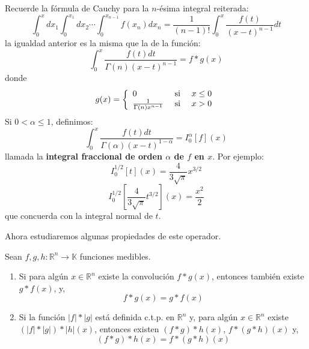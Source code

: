 \documentclass[12pt]{report}
\theoremstyle{largebreak}
\newcommand\cf[3]{\ensuremath{#1:#2\rightarrow#3}}
\newcommand\abs[1]{\ensuremath{\big|#1\big|}}
\begin{document}
    \begin{exa}
        Recuerde la fórmula de Cauchy para la $n$-ésima integral reiterada:
        \begin{equation*}
            \int_{ 0}^xdx_1\int_0^{x_1}dx_2\cdots \int_0^{ x_{n-1}}f(x_n)dx_n=\frac{1}{(n-1)!}\int_0^x\frac{f(t)}{(x-t)^{n-1}}dt
        \end{equation*}
        la igualdad anterior es la misma que la de la función:
        \begin{equation*}
            \int_0^x\frac{f(t)dt}{\Gamma(n)(x-t)^{n-1}}=f*g(x)
        \end{equation*}
        donde
        \begin{equation*}
            g(x)=\left\{
                \begin{array}{lcr}
                    0 & \textup{ si }&x\leq 0\\
                    \frac{1}{\Gamma(n)x^{n-1}} & \textup{ si }& x>0\\
                \end{array}
            \right.
        \end{equation*}
        Si $0<\alpha\leq 1$, definimos:
        \begin{equation*}
            \int_0^x\frac{f(t)dt}{\Gamma(\alpha)(x-t)^{1-\alpha}}=I^{\alpha}_0[f](x)
        \end{equation*}
        llamada la \textbf{integral fraccional de orden $\alpha$ de $f$ en $x$}. Por ejemplo:
        \begin{equation*}
            I^{1/2}_0[t](x)=\frac{4}{3\sqrt{\pi}}x^{3/2}
        \end{equation*}
        \begin{equation*}
            I^{1/2}_0\left[\frac{4}{3\sqrt{\pi}}t^{3/2}\right](x)=\frac{x^2}{2}
        \end{equation*}
        que concuerda con la integral normal de $t$.
    \end{exa}

    Ahora estudiaremos algunas propiedades de este operador.

    \begin{propo}
        Sean $\cf{f,g,h}{\mathbb{R}^n}{\mathbb{K}}$ funciones medibles.
        \begin{enumerate}
            \item Si para algún $x\in\mathbb{R}^n$ existe la convolución $f*g(x)$, entonces también existe $g*f(x)$, y,
            \begin{equation*}
                f*g(x)=g*f(x)
            \end{equation*}
            \item Si la función $\abs{f}*\abs{g}$ está definida c.t.p. en $\mathbb{R}^n$ y, para algún $x\in\mathbb{R}^n$ existe $(\abs{f}*\abs{g})*\abs{h}(x)$, entonces existen $(f*g)*h(x)$, $f*(g*h)(x)$ y,
            \begin{equation*}
                (f*g)*h(x)=f*(g*h)(x)
            \end{equation*}
        \end{enumerate}
    \end{propo}
\end{document}

